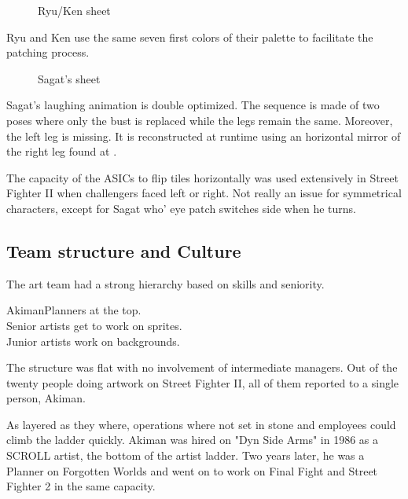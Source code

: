  \begin{figure}[H]
\caption*{Ryu/Ken sheet}
\end{figure}

Ryu and Ken use the same seven first colors of their palette to facilitate the patching process. 






 \begin{figure}[H]
\caption*{Sagat's sheet}
\end{figure}

Sagat's laughing animation is double optimized. The sequence is made of two poses where only the bust is replaced while the legs remain the same. Moreover, the left leg is missing. It is reconstructed at runtime using an horizontal mirror of the right leg found at .

\begin{trivia}
The capacity of the ASICs to flip tiles horizontally was used extensively in Street Fighter II when challengers faced left or right. Not really an issue for symmetrical characters, except for Sagat who' eye patch switches side when he turns.
\end{trivia}

\pagebreak

\subsection{Team structure and Culture}

The art team had a strong hierarchy based on skills and seniority.

\begin{q}{Akiman\cite{akiman2003}}Planners at the top.\\
Senior artists get to work on sprites. \\
Junior artists work on backgrounds.
\end{q}

The structure was flat with no involvement of intermediate managers. Out of the twenty people doing artwork on Street Fighter II, all of them reported to a single person, Akiman\cite{sf2_oral_history}.




As layered as they where, operations where not set in stone and employees could climb the ladder quickly. Akiman was hired on "Dyn Side Arms" in 1986 as a SCROLL artist, the bottom of the artist ladder. Two years later, he was a Planner on Forgotten Worlds and went on to work on Final Fight and Street Fighter 2 in the same capacity.

